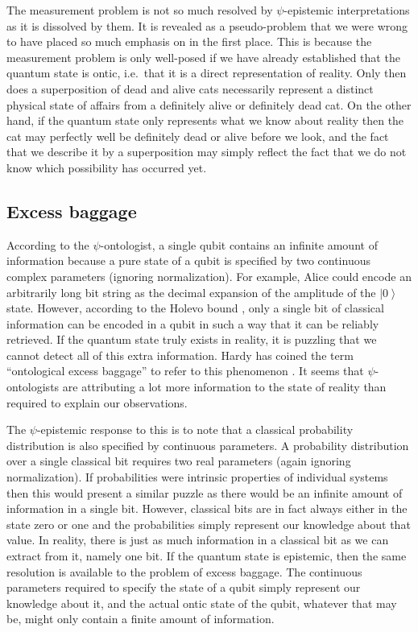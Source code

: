 \documentclass[DIV=calc,fontsize=12pt]{scrartcl} %
\theoremstyle{definition}
\theoremstyle{plain}
\newcommand{\Ket}[1]{\ensuremath{\left \vert #1 \right \rangle}}
\begin{document}
The measurement problem is not so much resolved by $\psi$-epistemic
interpretations as it is dissolved by them.  It is revealed as a
pseudo-problem that we were wrong to have placed so much emphasis on
in the first place.  This is because the measurement problem is only
well-posed if we have already established that the quantum state is
ontic, i.e.\ that it is a direct representation of reality.  Only then
does a superposition of dead and alive cats necessarily represent a
distinct physical state of affairs from a definitely alive or
definitely dead cat.  On the other hand, if the quantum state only
represents what we know about reality then the cat may perfectly well
be definitely dead or alive before we look, and the fact that we
describe it by a superposition may simply reflect the fact that we do
not know which possibility has occurred yet.

\subsection{Excess baggage}

\label{Excess}

According to the $\psi$-ontologist, a single qubit contains an
infinite amount of information because a pure state of a qubit is
specified by two continuous complex parameters (ignoring
normalization).  For example, Alice could encode an arbitrarily long
bit string as the decimal expansion of the amplitude of the $\Ket{0}$
state.  However, according to the Holevo bound \cite{Holevo1973}, only
a single bit of classical information can be encoded in a qubit in
such a way that it can be reliably retrieved.  If the quantum state
truly exists in reality, it is puzzling that we cannot detect all of
this extra information.  Hardy has coined the term ``ontological
excess baggage'' to refer to this phenomenon \cite{Hardy2004}.  It
seems that $\psi$-ontologists are attributing a lot more information
to the state of reality than required to explain our observations.

The $\psi$-epistemic response to this is to note that a classical
probability distribution is also specified by continuous parameters.
A probability distribution over a single classical bit requires two
real parameters (again ignoring normalization).  If probabilities were
intrinsic properties of individual systems then this would present a
similar puzzle as there would be an infinite amount of information in
a single bit.  However, classical bits are in fact always either in
the state zero or one and the probabilities simply represent our
knowledge about that value.  In reality, there is just as much
information in a classical bit as we can extract from it, namely one
bit.  If the quantum state is epistemic, then the same resolution is
available to the problem of excess baggage.  The continuous parameters
required to specify the state of a qubit simply represent our
knowledge about it, and the actual ontic state of the qubit, whatever
that may be, might only contain a finite amount of information.
\end{document}
